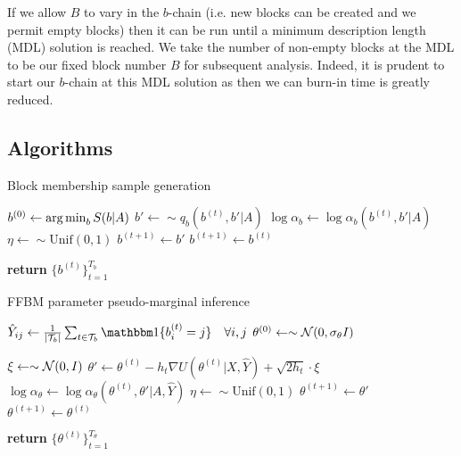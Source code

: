 If we allow $B$ to vary in the $b$-chain (i.e. new blocks can be created and we permit empty blocks) then it can be run  until a minimum description length (MDL) solution is reached. We take the number of non-empty blocks at the MDL to be our fixed block number $B$ for subsequent analysis. Indeed, it is prudent to start our $b$-chain at this MDL solution as then we can burn-in time is greatly reduced.

\subsection{Algorithms}
\label{appdx:algorithms}

\begin{algorithm} %
	\caption{Block membership sample generation} %
	\label{alg:b-samples} %
	\begin{algorithmic} %
		\State $b^{(0)} \gets \operatorname*{arg\,min}_b S(b|A)$ 
		\State $b' \gets \sim q_b(b^{(t)}, b' | A)$
		\State $\log \alpha_b \gets \log \alpha_b(b^{(t)}, b' | A)$
		\State $\eta \gets \sim \textrm{Unif}(0,1)$
		\State $b^{(t+1)} \gets b'$
		\Else
		\State $b^{(t+1)} \gets b^{(t)}$
		\EndIf
		\EndFor
		
		\State \textbf{return} $\{b^{(t)}\}_{t=1}^{T_b}$
		
	\end{algorithmic}
\end{algorithm}

\begin{algorithm} %
	\caption{FFBM parameter pseudo-marginal inference} %
	\label{alg:theta-samples} %
	\begin{algorithmic} %
		
		\State $\hat{Y}_{ij} \gets \frac{1}{|\Tcal_b|} \sum_{t \in \Tcal_b} \one \{ b^{(t)}_i = j\} \quad \forall i,j$
		\State $\theta^{(0)} \gets \sim \mathcal{N}(0, \sigma_\theta I)$
		
		\item[]
		
		\State $\xi \gets \sim \mathcal{N}(0, I)$
		\State $\theta' \gets \theta^{(t)} - h_t \nabla U(\theta^{(t)} | X, \hat{Y}) + \sqrt{2h_t} \cdot \xi$
		\State $\log \alpha_\theta \gets \log \alpha_\theta(\theta^{(t)}, \theta' | A, \hat{Y})$
		\State $\eta \gets \sim \textrm{Unif}(0,1)$
		\If{$\log \eta < \log \alpha_\theta$}
		\State $\theta^{(t+1)} \gets \theta'$
		\Else
		\State $\theta^{(t+1)} \gets \theta^{(t)}$
		\EndIf
		\EndFor
		
		\State \textbf{return} $\{\theta^{(t)}\}_{t=1}^{T_\theta}$
		
	\end{algorithmic}
\end{algorithm}

